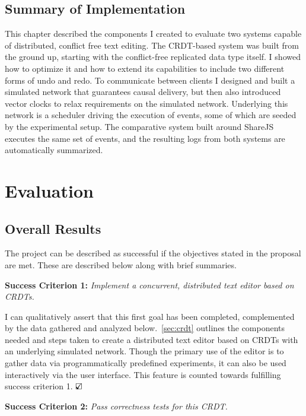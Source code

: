 \documentclass[12pt,a4paper,twoside,openright]{report}
\begin{document}
	\section{Summary of Implementation}
		This chapter described the components I created to evaluate two systems capable of distributed, conflict free text editing. The CRDT-based system was built from the ground up, starting with the conflict-free replicated data type itself. I showed how to optimize it and how to extend its capabilities to include two different forms of undo and redo. To communicate between clients I designed and built a simulated network that guarantees causal delivery, but then also introduced vector clocks to relax requirements on the simulated network. Underlying this network is a scheduler driving the execution of events, some of which are seeded by the experimental setup. The comparative system built around ShareJS executes the same set of events, and the resulting logs from both systems are automatically summarized.


\chapter{Evaluation}

	\section{Overall Results}
	
	The project can be described as successful if the objectives stated in the proposal are met. These are described below along with brief summaries.
	
	\textbf{Success Criterion 1:} \textit{Implement a concurrent, distributed text editor based on CRDTs.}
	
	I can qualitatively assert that this first goal has been completed, complemented by the data gathered and analyzed below.~\cref{sec:crdt} outlines the components needed and steps taken to create a distributed text editor based on CRDTs with an underlying simulated network. Though the primary use of the editor is to gather data via programmatically predefined experiments, it can also be used interactively via the user interface. This feature is counted towards fulfilling success criterion 1.  $\text{\rlap{$\checkmark$}}\square$
	
	\textbf{Success Criterion 2:} \textit{Pass correctness tests for this CRDT.}
	
\end{document}
